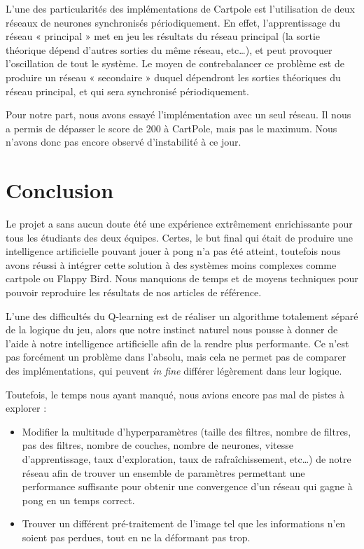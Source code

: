 \documentclass[
    10pt,
    a4paper,
    oneside,
    headinclude,footinclude,
    BCOR=5mm,
    captions=tableabove
]{scrartcl}
\begin{document}
L’une des particularités des implémentations de Cartpole est l’utilisation de deux réseaux de neurones synchronisés périodiquement. En effet, l’apprentissage du réseau « principal » met en jeu les résultats du réseau principal (la sortie théorique dépend d’autres sorties du même réseau, etc…), et peut provoquer l’oscillation de tout le système. Le moyen de contrebalancer ce problème est de produire un réseau « secondaire » duquel dépendront les sorties théoriques du réseau principal, et qui sera synchronisé périodiquement.

Pour notre part, nous avons essayé l'implémentation avec un seul réseau. Il nous a permis de dépasser le score de 200 à CartPole, mais pas le maximum. Nous n'avons donc pas encore observé d'instabilité à ce jour.

\section*{Conclusion}
Le projet a sans aucun doute été une expérience extrêmement enrichissante pour tous les étudiants des deux équipes. Certes, le but final qui était de produire une intelligence artificielle pouvant jouer à pong n’a pas été atteint, toutefois nous avons réussi à intégrer cette solution à des systèmes moins complexes comme cartpole ou Flappy Bird. Nous manquions de temps et de moyens techniques pour pouvoir reproduire les résultats de nos articles de référence.

L'une des difficultés du Q-learning est de réaliser un algorithme totalement séparé de la logique du jeu, alors que notre instinct naturel nous pousse à donner de l'aide à notre intelligence artificielle afin de la rendre plus performante. Ce n'est pas forcément un problème dans l'absolu, mais cela ne permet pas de comparer des implémentations, qui peuvent \textit{in fine} différer légèrement dans leur logique.

Toutefois, le temps nous ayant manqué, nous avions encore pas mal de pistes à explorer :

\begin{itemize}
\item Modifier la multitude d’hyperparamètres (taille des filtres, nombre de filtres, pas des filtres, nombre de couches, nombre de neurones, vitesse d’apprentissage, taux d’exploration, taux de rafraîchissement, etc…) de notre réseau afin de trouver un ensemble de paramètres permettant une performance suffisante pour obtenir une convergence d’un réseau qui gagne à pong en un temps correct.
\item Trouver un différent pré-traitement de l’image tel que les informations n’en soient pas perdues, tout en ne la déformant pas trop.
\end{itemize}

\renewcommand{\refname}{\spacedlowsmallcaps{References}} %

\end{document}
